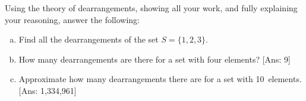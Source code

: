 \documentclass[11pt,letterpaper]{article}
\begin{document}
\newpage



 Using the theory of dearrangements, showing all your work, and fully explaining your reasoning, answer the following:
	\begin{enumerate}[(a)]
	\item Find all the dearrangements of the set $S= \{ 1, 2, 3 \}$. 
	\item How many dearrangements are there for a set with four elements? [Ans: 9]
	\item Approximate how many dearrangements there are for a set with 10~elements. [Ans: 1,334,961]
	\end{enumerate}
\end{document}
